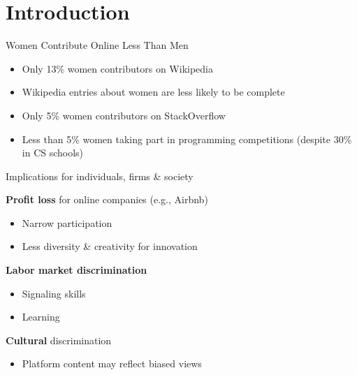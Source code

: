 \section{Introduction}\label{introduction}

\begin{frame}{Women Contribute Online Less Than Men}

\begin{itemize}[<+->]
\tightlist
\item
  Only 13\% women contributors on Wikipedia
\item
  Wikipedia entries about women are less likely to be complete
\item
  Only 5\% women contributors on StackOverflow
\item
  Less than 5\% women taking part in programming competitions (despite
  30\% in CS schools)
\end{itemize}

\end{frame}

\begin{frame}{Implications for individuals, firms \& society}

\textbf{Profit loss} for online companies (e.g., Airbnb)

\begin{itemize}
\tightlist
\item
  Narrow participation
\item
  Less diversity \& creativity for innovation
\end{itemize}

\pause

\textbf{Labor market discrimination}

\begin{itemize}
\tightlist
\item
  Signaling skills
\item
  Learning
\end{itemize}

\pause

\textbf{Cultural} discrimination

\begin{itemize}
\tightlist
\item
  Platform content may reflect biased views
\end{itemize}

\end{frame}

